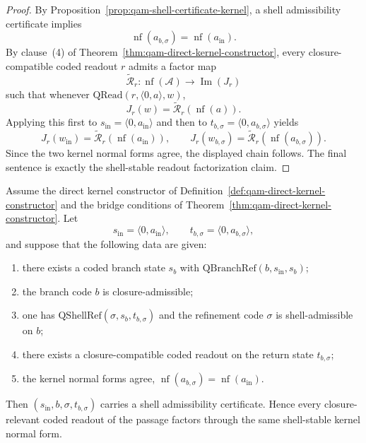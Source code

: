 \begin{proof}
By Proposition~\ref{prop:qam-shell-certificate-kernel}, a shell admissibility certificate implies
\[
\operatorname{nf}(a_{b,\sigma})=\operatorname{nf}(a_{\mathrm{in}}).
\]
By clause~(4) of Theorem~\ref{thm:qam-direct-kernel-constructor}, every closure-compatible coded readout $r$ admits a factor map
\[
\widetilde{\mathcal R}_r:\operatorname{nf}(\mathcal A)\to \operatorname{Im}(J_r)
\]
such that whenever $\mathrm{QRead}(r,\langle 0,a\rangle,w)$,
\[
J_r(w)=\widetilde{\mathcal R}_r(\operatorname{nf}(a)).
\]
Applying this first to $s_{\mathrm{in}}=\langle 0,a_{\mathrm{in}}\rangle$ and then to $t_{b,\sigma}=\langle 0,a_{b,\sigma}\rangle$ yields
\[
J_r(w_{\mathrm{in}})=\widetilde{\mathcal R}_r(\operatorname{nf}(a_{\mathrm{in}})),
\qquad
J_r(w_{b,\sigma})=\widetilde{\mathcal R}_r(\operatorname{nf}(a_{b,\sigma})).
\]
Since the two kernel normal forms agree, the displayed chain follows. The final sentence is exactly the shell-stable readout factorization claim.
\end{proof}

\begin{proposition}\label{prop:qam-shell-converse-criterion}
Assume the direct kernel constructor of Definition~\ref{def:qam-direct-kernel-constructor} and the bridge conditions of Theorem~\ref{thm:qam-direct-kernel-constructor}. Let
\[
s_{\mathrm{in}}=\langle 0,a_{\mathrm{in}}\rangle,
\qquad
 t_{b,\sigma}=\langle 0,a_{b,\sigma}\rangle,
\]
and suppose that the following data are given:
\begin{enumerate}[leftmargin=2em]
  \item there exists a coded branch state $s_b$ with $\mathrm{QBranchRef}(b,s_{\mathrm{in}},s_b)$;
  \item the branch code $b$ is closure-admissible;
  \item one has $\mathrm{QShellRef}(\sigma,s_b,t_{b,\sigma})$ and the refinement code $\sigma$ is shell-admissible on $b$;
  \item there exists a closure-compatible coded readout on the return state $t_{b,\sigma}$;
  \item the kernel normal forms agree, $\operatorname{nf}(a_{b,\sigma})=\operatorname{nf}(a_{\mathrm{in}})$.
\end{enumerate}
Then $(s_{\mathrm{in}},b,\sigma,t_{b,\sigma})$ carries a shell admissibility certificate. Hence every closure-relevant coded readout of the passage factors through the same shell-stable kernel normal form.
\end{proposition}

